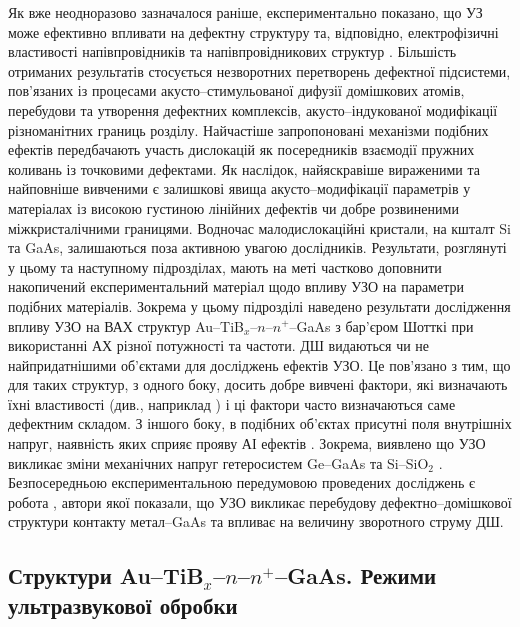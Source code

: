 Як вже неодноразово зазначалося раніше, експериментально показано, що УЗ може ефективно впливати на дефектну структуру та, відповідно, електрофізичні властивості напівпровідників та напівпровідникових структур \cite{Parchinskii2000r,Zaver,OlikhFTT,Parchinskii2003r,Ostrov2002FTPr,UST:SDErmol}.
Більшість отриманих результатів стосується незворотних перетворень  дефектної підсистеми, пов'язаних із процесами акусто--стимульованої дифузії домішкових атомів,  перебудови та утворення дефектних комплексів,  акусто--індукованої модифікації різноманітних границь розділу.
Найчастіше запропоновані механізми подібних ефектів передбачають участь дислокацій як посередників взаємодії пружних коливань із точковими дефектами.
Як наслідок, найяскравіше вираженими та найповніше вивченими є залишкові явища акусто--модифікації параметрів у матеріалах із високою густиною лінійних дефектів чи добре розвиненими міжкристалічними границями.
Водночас малодислокаційні кристали, на кшталт Si та GaAs, залишаються поза активною увагою дослідників.
Результати, розглянуті у цьому та наступному підрозділах, мають на меті частково доповнити
накопичений експериментальний матеріал щодо впливу УЗО на параметри подібних матеріалів.
Зокрема у цьому підрозділі наведено результати дослідження впливу УЗО
на ВАХ  структур Au--TiB$_x$--$n$--$n^+$--GaAs з бар’єром Шотткі при використанні АХ різної потужності та частоти.
ДШ видаються чи не найпридатнішими об’єктами для досліджень ефектів УЗО.
Це пов’язано з тим, що для таких структур, з одного боку, досить добре вивчені фактори, які визначають їхні властивості (див., наприклад \cite{Sze2012,Rhoderick1988,Singh1994,Evstropov2000,PipinsFTP})
і ці фактори часто визначаються саме дефектним складом.
З іншого боку, в подібних об’єктах присутні поля внутрішніх напруг, наявність яких сприяє прояву АІ ефектів \cite{Parchinskii2003r,Ostrov2002FTPr}.
Зокрема, виявлено що УЗО викликає зміни механічних напруг гетеросистем Ge--GaAs та Si--SiO$_2$ \cite{BritunFTT,Zdeb1989}.
Безпосередньою експериментальною передумовою проведених досліджень є робота \cite{UST:SDErmol},
автори якої показали, що УЗО викликає перебудову дефектно--домішкової структури контакту метал--GaAs та впливає на величину зворотного струму ДШ.


\subsection{Структури Au--TiB$_x$--$n$--$n^+$--GaAs. Режими ультразвукової обробки}


